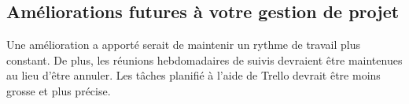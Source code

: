 \subsection{Améliorations futures à votre gestion de projet}

\begin{spacing}{1.5}
    Une amélioration a apporté serait de maintenir un rythme de travail plus constant. De plus, les réunions hebdomadaires de suivis devraient être maintenues au lieu d'être annuler. Les tâches planifié à l'aide de Trello devrait être moins grosse et plus précise.
\end{spacing}
